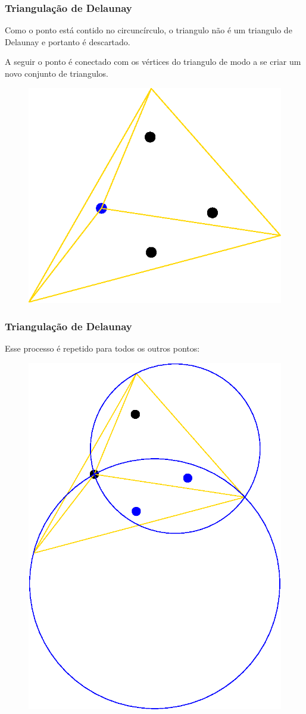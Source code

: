 \documentclass[brazil]{beamer}
\begin{document}
\begin{frame}
  \frametitle{Triangulação de Delaunay}

  Como o ponto está contido no circuncírculo, o triangulo não é um triangulo de Delaunay e portanto é descartado.

  A seguir o ponto é conectado com os vértices do triangulo de modo a se criar um novo conjunto de triangulos.

  \begin{figure}
    \includegraphics[width=0.5\linewidth]{dela7.eps}
  \end{figure}
\end{frame}

\begin{frame}
  \frametitle{Triangulação de Delaunay}

  Esse processo é repetido para todos os outros pontos:

  \begin{figure}
    \includegraphics[width=0.5\linewidth]{dela8.eps}
  \end{figure}
\end{frame}
\end{document}
